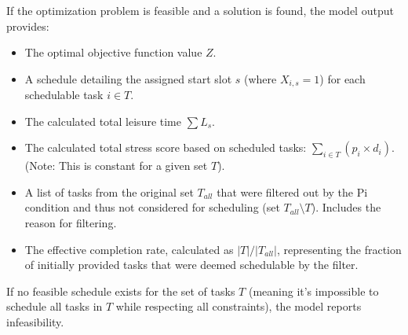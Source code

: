 \documentclass{article}
\begin{document}
If the optimization problem is feasible and a solution is found, the model output provides:
\begin{itemize}
    \item The optimal objective function value $Z$.
    \item A schedule detailing the assigned start slot $s$ (where $X_{i,s}=1$) for each schedulable task $i \in T$.
    \item The calculated total leisure time $\sum L_s$.
    \item The calculated total stress score based on scheduled tasks: $\sum_{i \in T} (p_i \times d_i)$. (Note: This is constant for a given set $T$).
    \item A list of tasks from the original set $T_{all}$ that were filtered out by the Pi condition and thus not considered for scheduling (set $T_{all} \setminus T$). Includes the reason for filtering.
    \item The effective completion rate, calculated as $|T| / |T_{all}|$, representing the fraction of initially provided tasks that were deemed schedulable by the filter.
\end{itemize}
If no feasible schedule exists for the set of tasks $T$ (meaning it's impossible to schedule all tasks in $T$ while respecting all constraints), the model reports infeasibility.
\end{document}
